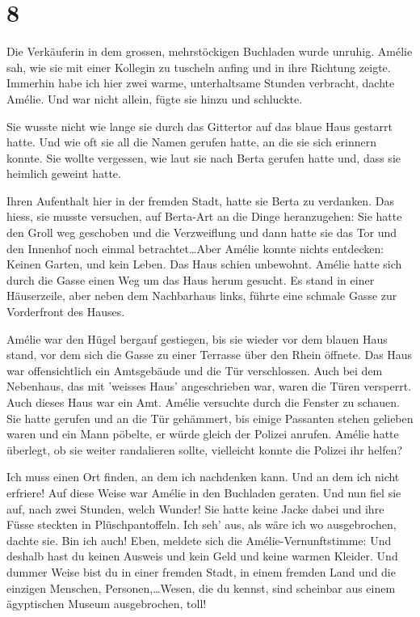 \documentclass[11pt,titlepage,a5paper]{book}
\begin{document}
\section*{8}

Die Verkäuferin in dem grossen, mehrstöckigen Buchladen wurde unruhig. Amélie sah, wie sie mit einer Kollegin zu tuscheln anfing und in ihre Richtung zeigte. Immerhin habe ich hier zwei warme, unterhaltsame Stunden verbracht, dachte Amélie. Und war nicht allein, fügte sie hinzu und schluckte.

Sie wusste nicht wie lange sie durch das Gittertor auf das blaue Haus gestarrt hatte. Und wie oft sie all die Namen gerufen hatte, an die sie sich erinnern konnte. Sie wollte vergessen, wie laut sie nach Berta gerufen hatte und, dass sie heimlich geweint hatte. 

Ihren Aufenthalt hier in der fremden Stadt, hatte sie Berta zu verdanken. Das hiess, sie musste versuchen, auf Berta-Art an die Dinge heranzugehen: Sie hatte den Groll weg geschoben und die Verzweiflung und dann hatte sie das Tor und den Innenhof noch einmal betrachtet\dots Aber Amélie konnte nichts entdecken: Keinen Garten, und kein Leben. Das Haus schien unbewohnt. Amélie hatte sich durch die Gasse einen Weg um das Haus herum gesucht. Es stand in einer Häuserzeile, aber neben dem Nachbarhaus links, führte eine schmale Gasse zur Vorderfront des Hauses.

Amélie war den Hügel bergauf gestiegen, bis sie wieder vor dem blauen Haus stand, vor dem sich die Gasse zu einer Terrasse über den Rhein öffnete. Das Haus war offensichtlich ein Amtsgebäude und die Tür verschlossen. Auch bei dem Nebenhaus, das mit 'weisses Haus' angeschrieben war, waren die Türen versperrt. Auch dieses Haus war ein Amt. Amélie versuchte durch die Fenster zu schauen. Sie  hatte gerufen und an die Tür gehämmert, bis einige Passanten stehen gelieben waren und ein Mann pöbelte, er würde gleich der Polizei anrufen. Amélie hatte überlegt, ob sie weiter randalieren sollte, vielleicht konnte die Polizei ihr helfen? 

Ich muss einen Ort finden, an dem ich nachdenken kann. Und an dem ich nicht erfriere! Auf diese Weise war Amélie in den Buchladen geraten. Und nun fiel sie auf, nach zwei Stunden, welch Wunder! Sie hatte keine Jacke dabei und ihre Füsse steckten in Plüschpantoffeln. Ich seh' aus, als wäre ich wo ausgebrochen, dachte sie. Bin ich auch! Eben, meldete sich die Amélie-Vernunftstimme: Und deshalb hast du keinen Ausweis und kein Geld und keine warmen Kleider. Und dummer Weise bist du in einer fremden Stadt, in einem fremden Land und die einzigen Menschen, Personen,\dots Wesen, die du kennst, sind scheinbar aus einem ägyptischen Museum ausgebrochen, toll!
\end{document}
